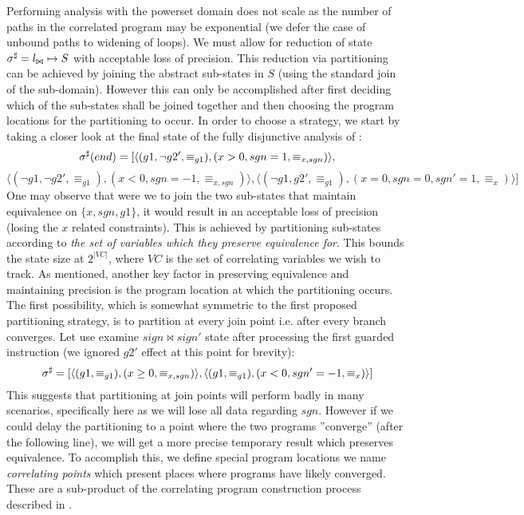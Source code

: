 Performing analysis with the powerset domain does not scale as the number of paths in the correlated program may be exponential (we defer the case of unbound paths to widening of loops). We must allow for reduction of state $\sigma^\sharp = l_{\bowtie} \mapsto S$ with acceptable loss of precision. This reduction via partitioning can be achieved by joining the abstract sub-states in $S$ (using the standard join of the sub-domain). However this can only be accomplished after first deciding which of the sub-states shall be joined together and then choosing the program locations for the partitioning to occur. In order to choose a strategy, we start by taking a closer look at the final state of the fully disjunctive analysis of :
{\footnotesize
\[
\sigma^\sharp(end) = [ \langle (g1,\neg g2',\equiv_{g1}),(x>0,sgn=1,\equiv_{x,sgn}) \rangle,
\]
\[
\langle (\neg g1,\neg g2',\equiv_{g1}), (x<0,sgn=-1,\equiv_{x,sgn}) \rangle,
\langle (\neg g1,g2',\equiv_{g1}),(x=0,sgn=0,sgn'=1,\equiv_{x}) \rangle ]
\]
}
One may observe that were we to join the two sub-states that maintain equivalence on $\{x,sgn,g1\}$, it would result in an acceptable loss of precision (losing the $x$ related constraints). This is achieved by partitioning sub-states according to \emph{the set of variables which they preserve equivalence for}. This bounds the state size at $2^{|VC|}$, where $VC$ is the set of correlating variables we wish to track.
As mentioned, another key factor in preserving equivalence and maintaining precision is the program location at which the partitioning occurs. The first possibility, which is somewhat symmetric to the first proposed partitioning strategy, is to partition at every join point i.e. after every branch converges. Let use examine $sign \bowtie sign'$ state after processing the first guarded instruction  (we ignored $g2'$ effect at this point for brevity):
{\footnotesize
\[
\sigma^\sharp = [ \langle (g1,\equiv_{g1}),(x \geq 0,\equiv_{x,sgn}) \rangle,
\langle (g1,\equiv_{g1}),(x < 0,sgn' = -1, \equiv_{x}) \rangle ]
\]
}
This suggests that partitioning at join points will perform badly in many scenarios, specifically here as we will lose all data regarding $sgn$. However if we could delay the partitioning to a point where the two programs ''converge'' (after the following  line), we will get a more precise temporary result which preserves equivalence. To accomplish this, we define special program locations we name \emph{correlating points} which present places where programs have likely converged. These are a sub-product of the correlating program construction process described in .

